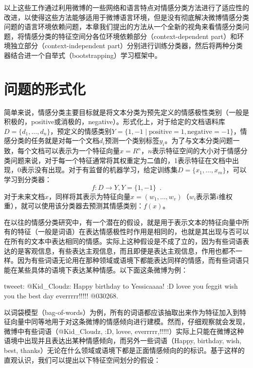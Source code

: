 以上这些工作通过利用微博的一些网络和语言特点对情感分类方法进行了适应性的改进，以使得这些方法能够适用于微博语言环境，但是没有彻底解决微博情感分类问题的语言环境依赖问题，本章我们提出的方法从一个全新的视角来看情感分类问题，将情感分类的特征空间分各位环境依赖部分（context-dependent part）和环境独立部分（context-independent part）分别进行训练分类器，然后将两种分类器结合进一个自举式（bootstrapping）学习框架中。

\section{问题的形式化}
\label{ch4_form}
简单来说，情感分类主要目标就是将文本分类为预先定义的情感极性类别（一般是积极的，positive或消极的，negative）。形式化上，对于给定的文档语料库$ D=\lbrace d_{1},\dots ,d_{n} \rbrace$，预定义的情感类别$ Y=\lbrace 1,-1\mid \mathrm{positive}=1,\mathrm{negative}=-1 \rbrace$，情感分类的任务就是对每一个文档$ d_{i} $预测一个类别标签$ y_{i} $。为了与文本分类问题一致，每个文档可以表示为一个特征向量$ x=R^{n} $，$ n $表示特征空间的大小对于情感分类问题来说，对于每一个特征通常将其权重定为二值的，1表示特征在文档中出现，0表示没有出现。对于有监督的机器学习，给定训练集$ D=\lbrace x_{1},\dots,x_{m} \rbrace $，可以学习到分类器：
\begin{equation}
\label{e1}
  f:D \longrightarrow Y, Y=\lbrace 1,-1 \rbrace \enspace .
\end{equation} 
对于未来文档$ x $，同样将其表示为特征向量$ x=\left( w_{1},\dots,w_{v} \right)  $（$ w_{i} $表示第$ i $维权重），就可以使用该分类器去预测其情感类别：$ f \left( x \right)   $。

在以往的情感分类研究中，有一个潜在的假设，就是用于表示文本的特征向量中所有的特征（一般是词语）在表达情感极性时作用是相同的，也就是其出现与否可以在所有的文本中表达相同的情感。实际上这种假设是不成了立的，因为有些词语表达的是客观信息，有些表达主观信息，而且即便是表达主观信息，作用也都不一样。因为有些词语无论用在那种领域或语境下都能表达同样的情感，而有些词语只能在某些具体的语境下表达某种情感。以下面这条微博为例：

\begin{description}
\item{tweeet:} @Kid\_Cloudz: Happy birthday to Yessicaaaa! :D lovee you feggit wish you the best day everrrrr!!!!! @030268.
\end{description}

以词袋模型（bag-of-words）为例，所有的词语都应该抽取出来作为特征加入到特征向量中同等地用于对这条微博的情感倾向进行建模。然而，仔细观察就会发现，微博中有些词语（@Kid\_Cloudz, :D, lovee, everrrrr,!!!!!）实际上只能在微博这种语境中出现并且表达出某种情感倾向，而另外一些词语（Happy, birthday, wish, best, thanks）无论在什么领域或语境下都是正面情感倾向的的标识。基于这样的直观认识，我们可以提出以下特征空间划分的假设：

